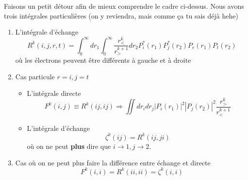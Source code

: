 Faisons un petit détour afin de mieux comprendre le cadre ci-dessus. Nous avons trois intégrales
particulières (on y reviendra, mais comme ça tu sais déjà hehe)
\begin{enumerate}
\item L'intégrale d'échange
\begin{equation}
R^k(i,j,r,t) = \int_0^\infty dr_1 \int_0^\infty \frac{r_<^k}{r_>^{k+1}}dr_2 P_i^*(r_1)P_j^*(r_2)
P_r(r_1)P_t(r_2)
\end{equation}
où les électrons peuvent être différents à gauche et à droite
\item Cas particule $r=i, j=t$
\begin{itemize} 
\item L'intégrale directe
\begin{equation}
F^k(i,j) \equiv R^k(ij,ij) \Rightarrow \iint dr_idr_j |P_i(r_1)|^2|P_j(r_2)|^2\frac{r_>^k}{r_<^{k+1}}
\end{equation}
\item L'intégrale d'échange
\begin{equation}
\zeta^k(ij) = R^k(ij,ji)
\end{equation}
où on ne peut \textbf{plus} dire que $i\to 1, j\to 2$.
\end{itemize}
\item Cas où on ne peut plus faire la différence entre échange et directe
\begin{equation}
F^k(i,i)= R^k(ii,ii) = \zeta^k(i,i)
\end{equation}
\end{enumerate}


